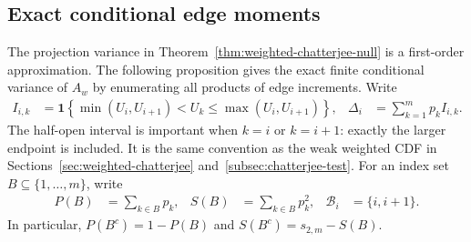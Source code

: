 \subsection{Exact conditional edge moments}
\label{subsec:chatterjee-exact-moments}

The projection variance in Theorem~\ref{thm:weighted-chatterjee-null} is a
first-order approximation. The following proposition gives the exact finite
conditional variance of $A_w$ by enumerating all products of edge increments.
Write
\begin{align*}
  I_{i,k}
  &=\mathbf{1}\!\left\{
    \min(U_i,U_{i+1})<U_k\leq\max(U_i,U_{i+1})
  \right\},
  &
  \Delta_i
  &=\sum_{k=1}^m p_k I_{i,k}.
\end{align*}
The half-open interval is important when $k=i$ or $k=i+1$: exactly the
larger endpoint is included. It is the same convention as the weak weighted
CDF in Sections~\ref{sec:weighted-chatterjee}
and~\ref{subsec:chatterjee-test}. For an index set
$B\subseteq\{1,\ldots,m\}$, write
\begin{align*}
  P(B)
  &=\sum_{k\in B}p_k,
  &
  S(B)
  &=\sum_{k\in B}p_k^2,
  &
  \mathcal B_i
  &=\{i,i+1\}.
\end{align*}
In particular, $P(B^c)=1-P(B)$ and $S(B^c)=s_{2,m}-S(B)$.

